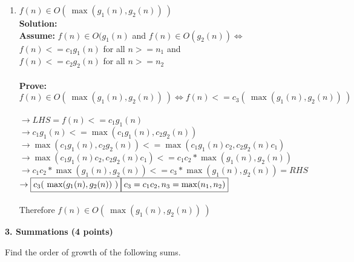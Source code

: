 \documentclass[12pt]{elsart}
\begin{document}
\begin{enumerate}
\begin{enumerate}
	{\bf Solution:}\\
	False. Counterexample:\\
	$f(n)=n$\\
	$g_1(n)=n$\\
	$g_2(n)=n^2$\\
	$f(n) \in g_1(n)$ and $f(n) \in g_2(n)$\\
	$\boxed{f(n) \not\in \frac{g_1(n)}{g_2(n)}}$\\\\
   \item $f(n)\in O( \ \max(g_1(n), g_2(n))\ )$\\
	{\bf Solution:}\\
	{\bf Assume:} $f(n)\in O(g_1(n)$ and $f(n)\in O(g_2(n)) \Leftrightarrow$\\
	$ f(n) <= c_1g_1(n)$ for all $n>=n_1$ and\\ 
	$f(n) <= c_2g_2(n)$ for all $n>=n_2$\\\\
	{\bf Prove:} $f(n)\in O( \ \max(g_1(n), g_2(n))\ ) \Leftrightarrow f(n) <= c_3( \ \max(g_1(n), g_2(n))\ )$\\\\
	$\rightarrow LHS = f(n) <= c_1g_1(n)$\\
	$\rightarrow c_1g_1(n) <= \max(c_1g_1(n), c_2g_2(n))$\\
	$\rightarrow \max(c_1g_1(n), c_2g_2(n)) <= \max(c_1g_1(n)c_2, c_2g_2(n)c_1)$\\
	$\rightarrow \max(c_1g_1(n)c_2, c_2g_2(n)c_1) <= c_1c_2*\max(g_1(n), g_2(n))$\\
	$\rightarrow c_1c_2*\max(g_1(n), g_2(n)) <= c_3*\max(g_1(n), g_2(n)) = RHS$\\
	$\rightarrow \boxed{c_3( \ \max(g_1(n), g_2(n))\ )} \hfill \boxed{c_3=c_1c_2, n_3=\max(n_1,n_2)}$\\\\
	Therefore $f(n)\in O( \ \max(g_1(n), g_2(n))\ )$\\
\end{enumerate}
\end{enumerate}

{\bf 3. Summations (4 points)}

Find the order of growth of the following sums.
\end{document}
